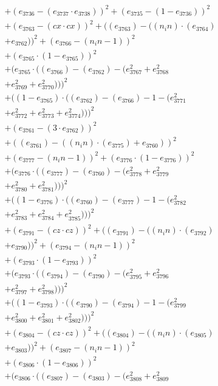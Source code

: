 \documentclass[10pt, a4paper]{article}
\begin{document}
\begin{small}
\begin{align*}
& + (e_{3736} - (e_{3737}  \cdot  e_{3738}))^{2} + (e_{3735} - (1 - e_{3736}))^{2} \\
& + (e_{3763} - (cx  \cdot  cx))^{2} + ((e_{3763}) - ((n_in)  \cdot  (e_{3764}) \\
& + e_{3762}))^{2} + (e_{3766} - (n_in - 1))^{2} \\
& + (e_{3765}  \cdot  (1 - e_{3765}))^{2} \\
& + (e_{3765}  \cdot  ((e_{3766}) - (e_{3762}) - (e_{3767}^{2} + e_{3768}^{2} \\
& + e_{3769}^{2} + e_{3770}^{2})))^{2} \\
& + ((1 - e_{3765})  \cdot  ((e_{3762}) - (e_{3766}) - 1 - (e_{3771}^{2} \\
& + e_{3772}^{2} + e_{3773}^{2} + e_{3774}^{2})))^{2} \\
& + (e_{3761} - (3  \cdot  e_{3762}))^{2} \\
& + ((e_{3761}) - ((n_in)  \cdot  (e_{3775}) + e_{3760}))^{2} \\
& + (e_{3777} - (n_in - 1))^{2} + (e_{3776}  \cdot  (1 - e_{3776}))^{2} \\
& + (e_{3776}  \cdot  ((e_{3777}) - (e_{3760}) - (e_{3778}^{2} + e_{3779}^{2} \\
& + e_{3780}^{2} + e_{3781}^{2})))^{2} \\
& + ((1 - e_{3776})  \cdot  ((e_{3760}) - (e_{3777}) - 1 - (e_{3782}^{2} \\
& + e_{3783}^{2} + e_{3784}^{2} + e_{3785}^{2})))^{2} \\
& + (e_{3791} - (cz  \cdot  cz))^{2} + ((e_{3791}) - ((n_in)  \cdot  (e_{3792}) \\
& + e_{3790}))^{2} + (e_{3794} - (n_in - 1))^{2} \\
& + (e_{3793}  \cdot  (1 - e_{3793}))^{2} \\
& + (e_{3793}  \cdot  ((e_{3794}) - (e_{3790}) - (e_{3795}^{2} + e_{3796}^{2} \\
& + e_{3797}^{2} + e_{3798}^{2})))^{2} \\
& + ((1 - e_{3793})  \cdot  ((e_{3790}) - (e_{3794}) - 1 - (e_{3799}^{2} \\
& + e_{3800}^{2} + e_{3801}^{2} + e_{3802}^{2})))^{2} \\
& + (e_{3804} - (cz  \cdot  cz))^{2} + ((e_{3804}) - ((n_in)  \cdot  (e_{3805}) \\
& + e_{3803}))^{2} + (e_{3807} - (n_in - 1))^{2} \\
& + (e_{3806}  \cdot  (1 - e_{3806}))^{2} \\
& + (e_{3806}  \cdot  ((e_{3807}) - (e_{3803}) - (e_{3808}^{2} + e_{3809}^{2} \\

\end{align*}
\end{small}
\end{document}
